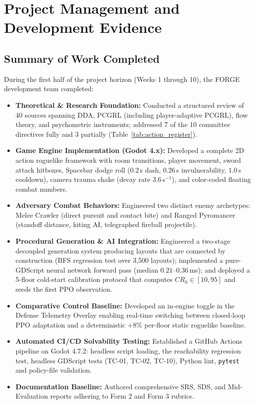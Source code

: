 \chapter{Project Management and Development Evidence}
\label{chap:mgmt}

\section{Summary of Work Completed}
During the first half of the project horizon (Weeks 1 through 10), the FORGE development team completed:
\begin{itemize}
    \item \textbf{Theoretical \& Research Foundation:} Conducted a structured review of 40 sources spanning DDA, PCGRL (including player-adaptive PCGRL), flow theory, and psychometric instruments; addressed 7 of the 10 committee directives fully and 3 partially (Table~\ref{tab:action_register}).
    \item \textbf{Game Engine Implementation (Godot 4.x):} Developed a complete 2D action roguelike framework with room transitions, player movement, sword attack hitboxes, Spacebar dodge roll ($0.2$\,s dash, $0.26$\,s invulnerability, $1.0$\,s cooldown), camera trauma shake (decay rate $3.6$\,s$^{-1}$), and color-coded floating combat numbers.
    \item \textbf{Adversary Combat Behaviors:} Engineered two distinct enemy archetypes: Melee Crawler (direct pursuit and contact bite) and Ranged Pyromancer (standoff distance, kiting AI, telegraphed fireball projectile).
    \item \textbf{Procedural Generation \& AI Integration:} Engineered a two-stage decoupled generation system producing layouts that are connected by construction (BFS regression test over 3,500 layouts); implemented a pure-GDScript neural network forward pass (median $0.21$--$0.36$\,ms); and deployed a 5-floor cold-start calibration protocol that computes $CR_0 \in [10, 95]$ and seeds the first PPO observation.
    \item \textbf{Comparative Control Baseline:} Developed an in-engine toggle in the Defense Telemetry Overlay enabling real-time switching between closed-loop PPO adaptation and a deterministic $+8\%$ per-floor static roguelike baseline.
    \item \textbf{Automated CI/CD Solvability Testing:} Established a GitHub Actions pipeline on Godot 4.7.2: headless script loading, the reachability regression test, headless GDScript tests (TC-01, TC-02, TC-10), Python lint, \texttt{pytest} and policy-file validation.
    \item \textbf{Documentation Baseline:} Authored comprehensive SRS, SDS, and Mid-Evaluation reports adhering to Form 2 and Form 3 rubrics.
\end{itemize}

